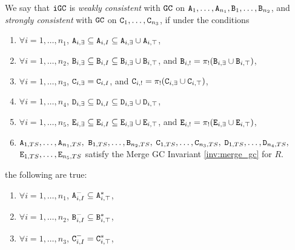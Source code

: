 \begin{property}
We say that $\tt{iGC}$ is \emph{weakly consistent} with $\tt{GC}$ on $\tt{A}_1, \dots, \tt{A}_{n_1}, \tt{B}_1, \dots, \tt{B}_{n_2}$, and \emph{strongly consistent} with $\tt{GC}$ on $\tt{C}_1, \dots, \tt{C}_{n_3}$, if under the conditions
\begin{enumerate}
\item $\forall i=1,\dots,n_1$, $\tt{A}_{i,\exists} \subseteq \tt{A}_{i,I} \subseteq \tt{A}_{i,\exists} \cup \tt{A}_{i,\top}$,
\item $\forall i=1,\dots,n_2$, $\tt{B}_{i,\exists} \subseteq \tt{B}_{i,I} \subseteq \tt{B}_{i,\exists} \cup \tt{B}_{i,\top}$, and $\tt{B}_{i,!} = \pi_!(\tt{B}_{i,\exists} \cup \tt{B}_{i,\top})$,
\item $\forall i=1,\dots,n_3$, $\tt{C}_{i,\exists} =         \tt{C}_{i,I}$,                                                   and $\tt{C}_{i,!} = \pi_!(\tt{C}_{i,\exists} \cup \tt{C}_{i,\top})$,
\item $\forall i=1,\dots,n_4$, $\tt{D}_{i,\exists} \subseteq \tt{D}_{i,I} \subseteq \tt{D}_{i,\exists} \cup \tt{D}_{i,\top}$,
\item $\forall i=1,\dots,n_5$, $\tt{E}_{i,\exists} \subseteq \tt{E}_{i,I} \subseteq \tt{E}_{i,\exists} \cup \tt{E}_{i,\top}$, and $\tt{E}_{i,!} = \pi_!(\tt{E}_{i,\exists} \cup \tt{E}_{i,\top})$,
\item $\tt{A}_{1,TS}, \dots, \tt{A}_{n_1,TS},$ $\tt{B}_{1,TS}, \dots, \tt{B}_{n_2,TS},$ $\tt{C}_{1,TS}, \dots, \tt{C}_{n_3,TS},$ $\tt{D}_{1,TS}, \dots, \tt{D}_{n_4,TS},$ $\tt{E}_{1,TS}, \dots, \tt{E}_{n_5,TS}$ satisfy the Merge GC Invariant \ref{inv:merge_gc} for $R$.
\end{enumerate}
the following are true:
\begin{enumerate}
\item $\forall i=1,\dots,n_1$, $\tt{A}_{i,I}^- \subseteq \tt{A}_{i,\top}^*$,
\item $\forall i=1,\dots,n_2$, $\tt{B}_{i,I}^- \subseteq \tt{B}_{i,\top}^*$,
\item $\forall i=1,\dots,n_3$, $\tt{C}_{i,I}^- =         \tt{C}_{i,\top}^*$,
\end{enumerate}
\end{property}


